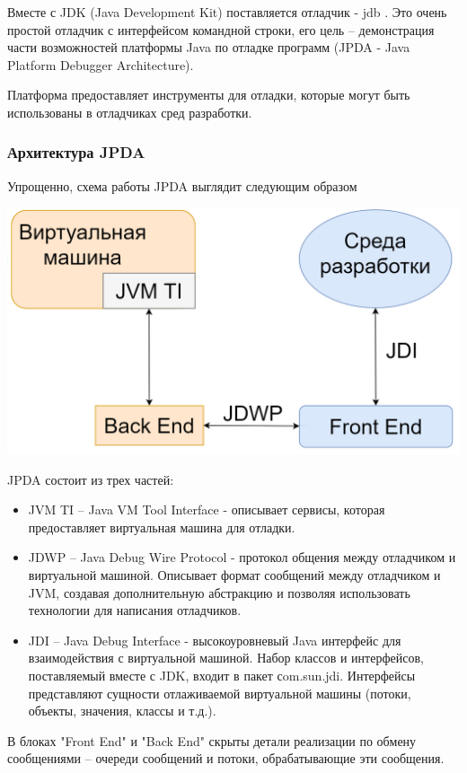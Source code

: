 Вместе с JDK (Java Development Kit) поставляется отладчик - jdb \cite{debug:jdb}. Это очень простой отладчик с интерфейсом командной строки, его цель -- демонстрация части возможностей платформы Java по отладке программ (JPDA - Java Platform Debugger Architecture). 

Платформа предоставляет инструменты для отладки, которые могут быть использованы в отладчиках сред разработки.

\subsubsection{Архитектура JPDA}\label{jdpa}
Упрощенно, схема работы JPDA выглядит следующим образом

\vspace{1em}
\includegraphics[scale=0.4]{chapter1/img/jdpa.png}

JPDA состоит из трех частей:
\begin{itemize}
	\item JVM TI -- Java VM Tool Interface - описывает сервисы, которая предоставляет виртуальная машина для отладки. 
	\item JDWP -- Java Debug Wire Protocol - протокол общения между отладчиком и виртуальной машиной. Описывает формат сообщений между отладчиком и JVM, создавая дополнительную абстракцию и позволяя использовать технологии для написания отладчиков.
	\item JDI -- Java Debug Interface - высокоуровневый Java интерфейс для взаимодействия с виртуальной машиной. Набор классов и интерфейсов, поставляемый вместе с JDK, входит в пакет сom.sun.jdi. Интерфейсы представляют сущности отлаживаемой виртуальной машины (потоки, объекты, значения, классы и т.д.).
\end{itemize}

В блоках "Front End" и "Back End" скрыты детали реализации по обмену сообщениями -- очереди сообщений и потоки, обрабатывающие эти сообщения.


